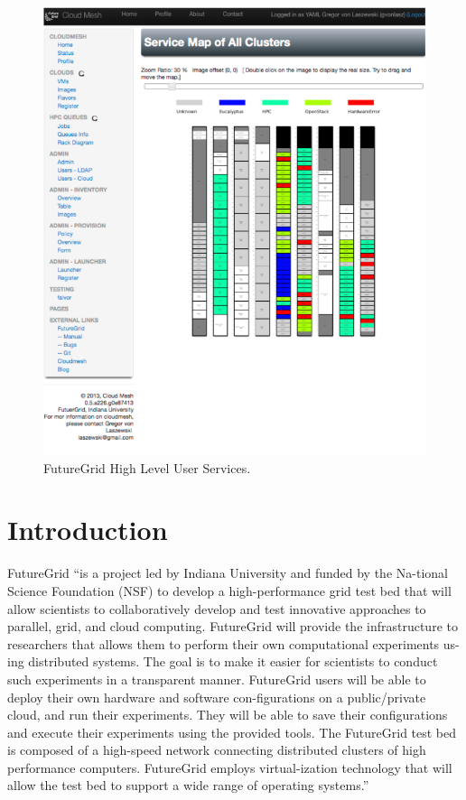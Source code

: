 \documentclass{article}
\begin{document}
\begin{figure}[h!]
  \caption{FutureGrid High Level User Services.}
  \centering
    \includegraphics[width=1.0\textwidth]{images/rainbow.pdf}
\end{figure}

\section{Introduction}

FutureGrid \cite{las2010gce,las12fg-bookchapter}“is a project led by Indiana University and funded by the Na-tional Science Foundation (NSF) to develop a high-performance grid test bed that will allow scientists to collaboratively develop and test innovative approaches to parallel, grid, and cloud computing. FutureGrid will provide the infrastructure to researchers that allows them to perform their own computational experiments us-ing distributed systems. The goal is to make it easier for scientists to conduct such experiments in a transparent manner.  FutureGrid users will be able to deploy their own hardware and software con-figurations on a public/private cloud, and run their experiments. They will be able to save their configurations and execute their experiments using the provided tools. The FutureGrid test bed is composed of a high-speed network connecting distributed clusters of high performance computers. FutureGrid employs virtual-ization technology that will allow the test bed to support a wide range of operating systems.”
\end{document}
